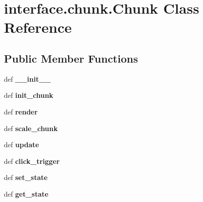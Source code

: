 \hypertarget{classinterface_1_1chunk_1_1_chunk}{\section{interface.\-chunk.\-Chunk \-Class \-Reference}
\label{classinterface_1_1chunk_1_1_chunk}
}
\subsection*{\-Public \-Member \-Functions}
\begin{DoxyCompactItemize}
\item 
\hypertarget{classinterface_1_1chunk_1_1_chunk_a11149d978c9f6ee9c7272214b1236869}{def {\bfseries \-\_\-\-\_\-init\-\_\-\-\_\-}}\label{classinterface_1_1chunk_1_1_chunk_a11149d978c9f6ee9c7272214b1236869}

\item 
\hypertarget{classinterface_1_1chunk_1_1_chunk_abc29661f82910e5678943674aa60dbd1}{def {\bfseries init\-\_\-chunk}}\label{classinterface_1_1chunk_1_1_chunk_abc29661f82910e5678943674aa60dbd1}

\item 
\hypertarget{classinterface_1_1chunk_1_1_chunk_abde5119452bf668f483c50b6e93333a6}{def {\bfseries render}}\label{classinterface_1_1chunk_1_1_chunk_abde5119452bf668f483c50b6e93333a6}

\item 
\hypertarget{classinterface_1_1chunk_1_1_chunk_af4ceacbb4669cc87800fd6da09f3db52}{def {\bfseries scale\-\_\-chunk}}\label{classinterface_1_1chunk_1_1_chunk_af4ceacbb4669cc87800fd6da09f3db52}

\item 
\hypertarget{classinterface_1_1chunk_1_1_chunk_ae5f9a88ac4e5a67765b854e288bdb317}{def {\bfseries update}}\label{classinterface_1_1chunk_1_1_chunk_ae5f9a88ac4e5a67765b854e288bdb317}

\item 
\hypertarget{classinterface_1_1chunk_1_1_chunk_ae81d602d31acce5d7c5e86d8116478dd}{def {\bfseries click\-\_\-trigger}}\label{classinterface_1_1chunk_1_1_chunk_ae81d602d31acce5d7c5e86d8116478dd}

\item 
\hypertarget{classinterface_1_1chunk_1_1_chunk_af0b2dfd6782de3a492eef961b370e59f}{def {\bfseries set\-\_\-state}}\label{classinterface_1_1chunk_1_1_chunk_af0b2dfd6782de3a492eef961b370e59f}

\item 
\hypertarget{classinterface_1_1chunk_1_1_chunk_a755d62925a041fcc6d7a50f5379e39ed}{def {\bfseries get\-\_\-state}}\label{classinterface_1_1chunk_1_1_chunk_a755d62925a041fcc6d7a50f5379e39ed}

\end{DoxyCompactItemize}
